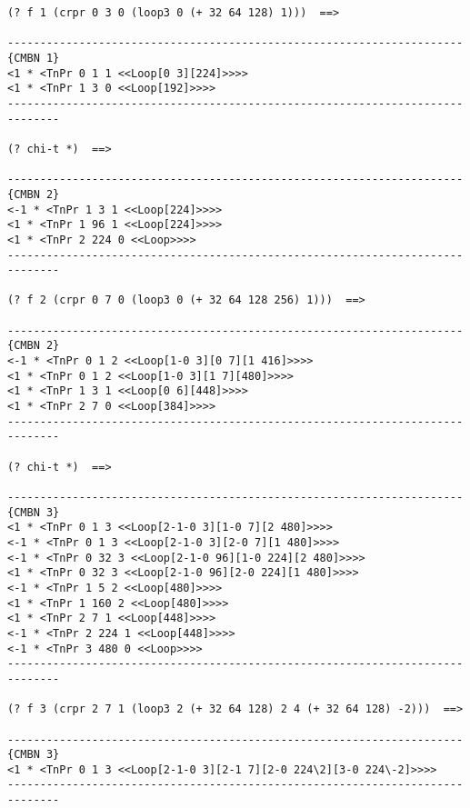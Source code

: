 {\footnotesize\begin{verbatim}
(? f 1 (crpr 0 3 0 (loop3 0 (+ 32 64 128) 1)))  ==>

----------------------------------------------------------------------{CMBN 1}
<1 * <TnPr 0 1 1 <<Loop[0 3][224]>>>>
<1 * <TnPr 1 3 0 <<Loop[192]>>>>
------------------------------------------------------------------------------

(? chi-t *)  ==>

----------------------------------------------------------------------{CMBN 2}
<-1 * <TnPr 1 3 1 <<Loop[224]>>>>
<1 * <TnPr 1 96 1 <<Loop[224]>>>>
<1 * <TnPr 2 224 0 <<Loop>>>>
------------------------------------------------------------------------------

(? f 2 (crpr 0 7 0 (loop3 0 (+ 32 64 128 256) 1)))  ==>

----------------------------------------------------------------------{CMBN 2}
<-1 * <TnPr 0 1 2 <<Loop[1-0 3][0 7][1 416]>>>>
<1 * <TnPr 0 1 2 <<Loop[1-0 3][1 7][480]>>>>
<1 * <TnPr 1 3 1 <<Loop[0 6][448]>>>>
<1 * <TnPr 2 7 0 <<Loop[384]>>>>
------------------------------------------------------------------------------

(? chi-t *)  ==>

----------------------------------------------------------------------{CMBN 3}
<1 * <TnPr 0 1 3 <<Loop[2-1-0 3][1-0 7][2 480]>>>>
<-1 * <TnPr 0 1 3 <<Loop[2-1-0 3][2-0 7][1 480]>>>>
<-1 * <TnPr 0 32 3 <<Loop[2-1-0 96][1-0 224][2 480]>>>>
<1 * <TnPr 0 32 3 <<Loop[2-1-0 96][2-0 224][1 480]>>>>
<-1 * <TnPr 1 5 2 <<Loop[480]>>>>
<1 * <TnPr 1 160 2 <<Loop[480]>>>>
<1 * <TnPr 2 7 1 <<Loop[448]>>>>
<-1 * <TnPr 2 224 1 <<Loop[448]>>>>
<-1 * <TnPr 3 480 0 <<Loop>>>>
------------------------------------------------------------------------------

(? f 3 (crpr 2 7 1 (loop3 2 (+ 32 64 128) 2 4 (+ 32 64 128) -2)))  ==>

----------------------------------------------------------------------{CMBN 3}
<1 * <TnPr 0 1 3 <<Loop[2-1-0 3][2-1 7][2-0 224\2][3-0 224\-2]>>>>
------------------------------------------------------------------------------
\end{verbatim}}
\newpage
